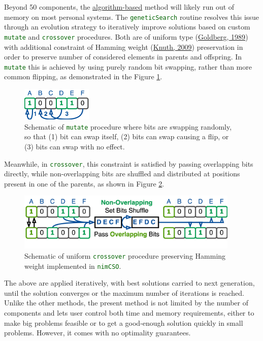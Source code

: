 \documentclass[
]{article}
\let\oldtexttt\texttt
\renewcommand{\texttt}[1]{\oldtexttt{\textcolor{darkgreen}{#1}}}
\begin{document}
Beyond 50 components, the
\protect\hyperlink{algorithm-based-search}{algorithm-based} method will
likely run out of memory on most personal systems. The
\texttt{geneticSearch} routine resolves this issue through an evolution
strategy to iteratively improve solutions based on custom
\texttt{mutate} and \texttt{crossover} procedures. Both are of uniform
type (\protect\hyperlink{ref-Goldberg1989}{Goldberg, 1989}) with
additional constraint of Hamming weight
(\protect\hyperlink{ref-Knuth}{Knuth, 2009}) preservation in order to
preserve number of considered elements in parents and offspring. In
\texttt{mutate} this is achieved by using purely random bit swapping,
rather than more common flipping, as demonstrated in the Figure
\ref{fig:mutate}.

\begin{figure}[h]
  \centering
  \includegraphics[width=1.31944in,height=\textheight]{assets/nimcso_mutate.drawio.png}
  \caption{Schematic of \texttt{mutate} procedure where bits are swapping
  randomly, so that (1) bit can swap itself, (2) bits can swap causing a
  flip, or (3) bits can swap with no effect.}
  \label{fig:mutate}
\end{figure}

Meanwhile, in \texttt{crossover}, this constraint is satisfied by
passing overlapping bits directly, while non-overlapping bits are
shuffled and distributed at positions present in one of the parents, as
shown in Figure \ref{fig:crossover}.

\begin{figure}[h]
\centering
\includegraphics[width=4.16667in,height=\textheight]{assets/nimcso_crossover.drawio.png}
\caption{Schematic of uniform \texttt{crossover} procedure preserving
Hamming weight implemented in \texttt{nimCSO}.}
\label{fig:crossover}
\end{figure}

The above are applied iteratively, with best solutions carried to next
generation, until the solution converges or the maximum number of
iterations is reached. Unlike the other methods, the present method is
not limited by the number of components and lets user control both time
and memory requirements, either to make big problems feasible or to get
a good-enough solution quickly in small problems. However, it comes with
no optimality guarantees.
\end{document}
